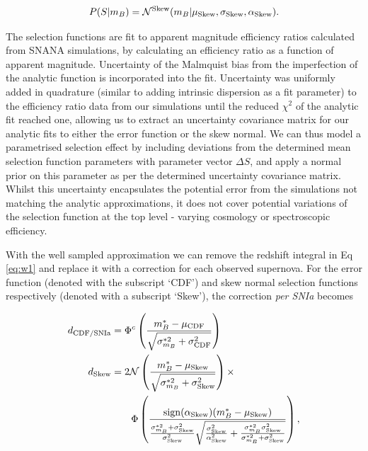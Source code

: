\documentclass[a4paper,fleqn,usenatbib]{mnras}
\newcommand{\green}{\color{forestgreen}}
\begin{document}
\begin{align}
P(S|m_B) = \mathcal{N}^{{\rm Skew}}(m_B | \mu_{\rm Skew}, \sigma_{\rm Skew}, \alpha_{\rm Skew}).
\end{align}


The selection functions are fit to apparent magnitude efficiency ratios calculated from SNANA simulations, by calculating an efficiency ratio as a function of apparent magnitude. Uncertainty of the Malmquist bias from the imperfection of the analytic function is incorporated into the fit. Uncertainty was uniformly added in quadrature (similar to adding intrinsic dispersion as a fit parameter) to the efficiency ratio data from our simulations until the reduced $\chi^2$ of the analytic fit reached one, allowing us to extract an uncertainty covariance matrix for our analytic fits to either the error function or the skew normal. We can thus model a parametrised selection effect by including deviations from the determined mean selection function parameters with parameter vector $\Delta S$, and apply a normal prior on this parameter as per the determined uncertainty covariance matrix. {\green Whilst this uncertainty encapsulates the potential error from the simulations not matching the analytic approximations, it does not cover potential variations of the selection function at the top level - varying cosmology or spectroscopic efficiency.}


With the well sampled approximation we can remove the redshift integral in Eq \eqref{eq:w1} and replace it with a correction for each observed supernova. For the error function (denoted with the subscript `CDF') and skew normal selection functions respectively (denoted with a subscript `Skew'), the correction \textit{per SNIa} becomes

\begin{align}
d_{\rm CDF/SNIa} &= \Phi^c\left(  \frac{m^*_B - \mu_{\rm CDF}}{\sqrt{\sigma^{*2}_{m_B} + \sigma_{\rm CDF}^2}}  \right) \label{eq:seldes}\\
d_{\rm Skew} &= 2\mathcal{N}\left( \frac{m_B^* - \mu_{\rm Skew}}{\sqrt{\sigma^{*2}_{m_B} + \sigma_{\rm Skew}^2}}\right) \times \notag\\
&\quad\quad \Phi\left(  \frac{{\rm sign}(\alpha_{\rm Skew})(m_B^* - \mu_{\rm Skew})}{\frac{\sigma_{m_B}^{*2} + \sigma^2_{\rm Skew}}{\sigma^2_{\rm Skew}} \sqrt{\frac{\sigma^2_{\rm Skew}}{\alpha^2_{\rm Skew}} + \frac{\sigma_{m_B}^{*2} \sigma^2_{\rm Skew}}{\sigma_{m_B}^{*2} + \sigma^2_{\rm Skew}}} }\right), \label{eq:sellowz}
\end{align}
\end{document}
